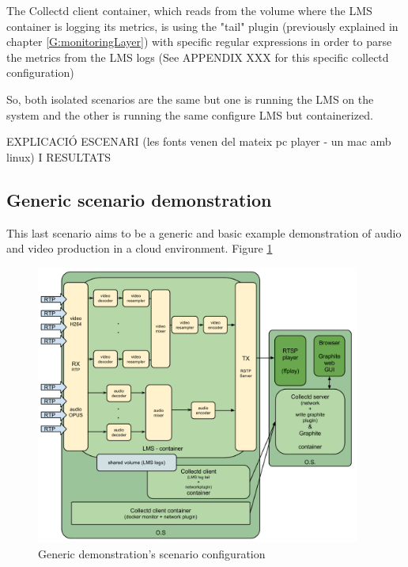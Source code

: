 The Collectd client container, which reads from the volume where the LMS container is logging its metrics, is using the "tail" plugin (previously explained in chapter \ref{G:monitoringLayer}) with specific regular expressions in order to parse the metrics from the LMS logs (See APPENDIX XXX for this specific collectd configuration)

So, both isolated scenarios are the same but one is running the LMS on the system and the other is running the same configure LMS but containerized.

EXPLICACIÓ ESCENARI (les fonts venen del mateix pc player - un mac amb linux) I 
RESULTATS


\subsection{Generic scenario demonstration}

This last scenario aims to be a generic and basic example demonstration of audio and video production in a cloud environment. Figure \ref{F:gdsc}



\begin{figure}[htb]
\begin{center}
\includegraphics[width=0.95\textwidth]{./images/genericScenario.png}
\caption{Generic demonstration's scenario configuration}
\label{F:gdsc}
\end{center}
\end{figure}
